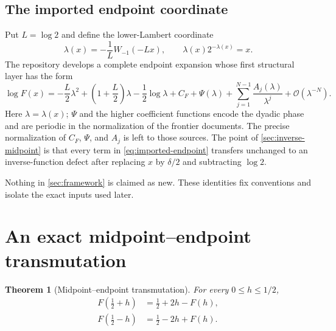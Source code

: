 \documentclass[11pt,oneside]{article}
\newtheorem{theorem}{Theorem}[section]
\theoremstyle{definition}
\theoremstyle{remark}
\newcommand{\bigO}{\mathcal O}
\begin{document}
\subsection{The imported endpoint coordinate}
Put $L=\log2$ and define the lower-Lambert coordinate~\cite{corless,frontier}
\begin{equation}
 \lambda(x)=-\frac1L W_{-1}(-Lx),
 \qquad \lambda(x)2^{-\lambda(x)}=x.
 \label{eq:lambda}
\end{equation}
The repository develops a complete endpoint expansion whose first structural layer has the form
\begin{equation}
 \log F(x)
 =-\frac L2\lambda^2
  +\left(1+\frac L2\right)\lambda
  -\frac12\log\lambda
  +C_F+\Psi(\lambda)
  +\sum_{j=1}^{N-1}\frac{A_j(\lambda)}{\lambda^j}
  +\bigO(\lambda^{-N}).
 \label{eq:imported-endpoint}
\end{equation}
Here $\lambda=\lambda(x)$; $\Psi$ and the higher coefficient functions encode the dyadic phase and are periodic in the normalization of the frontier documents.  The precise normalization of $C_F$, $\Psi$, and $A_j$ is left to those sources.  The point of \cref{sec:inverse-midpoint} is that every term in \eqref{eq:imported-endpoint} transfers unchanged to an inverse-function defect after replacing $x$ by $\delta/2$ and subtracting $\log2$.

\begin{establishedinputbox}
Nothing in \cref{sec:framework} is claimed as new.  These identities fix conventions and isolate the exact inputs used later.
\end{establishedinputbox}

\section{An exact midpoint--endpoint transmutation}
\label{sec:midpoint}

\begin{theorem}[Midpoint--endpoint transmutation]
\label{thm:midpoint-transmutation}
For every $0\le h\le1/2$,
\begin{align}
 F\!\left(\frac12+h\right)&=\frac12+2h-F(h),
 \label{eq:midpoint-plus}\\
 F\!\left(\frac12-h\right)&=\frac12-2h+F(h).
 \label{eq:midpoint-minus}
\end{align}
\end{theorem}
\end{document}
